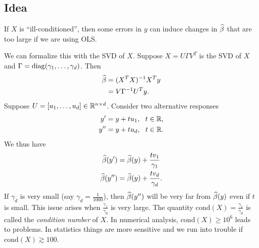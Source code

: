 \subsection{Idea}
If $X$ is ``ill-conditioned'', then some errors in $y$ can induce changes in $\widehat{\beta}$ that are too large if we are using OLS. 

We can formalize this with the SVD of $X$. Suppose $X = U \Gamma V^T$ is the SVD of $X$ and $\Gamma = \operatorname*{diag}(\gamma_1,\ldots, \gamma_d)$. Then
\begin{align*}
    \widehat{\beta} &= (X^TX)^{-1}X^Ty \\
    &= V\Gamma^{-1}U^Ty.
\end{align*}
Suppose $U=[u_1,\ldots, u_d] \in {\mathbb R}^{n \times d}$. Consider two alternative responses 
\begin{align*}
    y'&= y+tu_1,~~t \in {\mathbb R},\\
    y''&=y+tu_d,~~t \in {\mathbb R}.
\end{align*}
We thus have 
\begin{align*}
    \widehat{\beta}(y')&=\widehat{\beta}(y)+\frac{tv_1}{\gamma_1}\\
    \widehat{\beta}(y'') &= \widehat{\beta}(y)+\frac{tv_d}{\gamma_d}.
\end{align*}
If $\gamma_d$ is very small (say $\gamma_d = \frac{1}{1000}$), then $\widehat{\beta}(y'')$ will be very far from $\widehat{\beta}(y)$ even if $t$ is small. This issue arises when $\frac{\gamma_1}{\gamma_d}$ is very large. The quantity $\text{cond}(X)=\frac{\gamma_1}{\gamma_d}$ is called the \emph{condition number} of $X$. In numerical analysis, $\text{cond}(X) \ge 10^6$ leads to problems. In statistics things are more sensitive and we run into trouble if $\text{cond}(X) \gtrsim 100$. 
